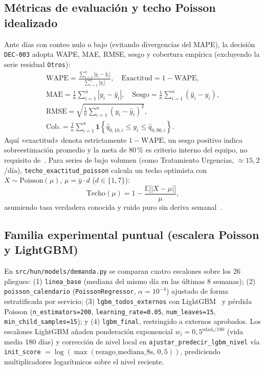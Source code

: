 \subsection{Métricas de evaluación y techo Poisson idealizado}

Ante días con conteo nulo o bajo (evitando divergencias del MAPE), la decisión \texttt{DEC-003} adopta WAPE, MAE, RMSE, sesgo y cobertura empírica (excluyendo la serie residual \texttt{Otros}):
\begin{equation}
\label{eq:metricas}
\begin{gathered}
\text{WAPE} = \frac{\sum_{i=1}^{n} |y_i - \hat{y}_i|}{\sum_{i=1}^{n} |y_i|}, \quad
\text{Exactitud} = 1 - \text{WAPE}, \\
\text{MAE} = \frac{1}{n}\sum_{i=1}^{n} |y_i - \hat{y}_i|, \quad
\text{Sesgo} = \frac{1}{n}\sum_{i=1}^{n} (\hat{y}_i - y_i), \\
\text{RMSE} = \sqrt{\frac{1}{n}\sum_{i=1}^{n} (y_i - \hat{y}_i)^2}, \\
\text{Cob.} = \frac{1}{n}\sum_{i=1}^{n} \mathbf{1}\!\left\{\hat{q}_{0{,}10,i} \le y_i \le \hat{q}_{0{,}90,i}\right\}.
\end{gathered}
\end{equation}
Aquí «exactitud» denota estrictamente $1-\text{WAPE}$, un sesgo positivo indica sobreestimación promedio y la meta de 80\,\% es criterio interno del equipo, no requisito de~\cite{hun2026terminos,mediflow2026demanda}. Para series de bajo volumen (como Tratamiento Urgencias, $\approx 15{,}2$/día), \texttt{techo\_exactitud\_poisson} calcula un techo optimista con $X \sim \text{Poisson}(\mu)$, $\mu = \bar{y}\cdot d$ ($d \in \{1,7\}$):
\begin{equation}
\label{eq:techo_poisson}
\text{Techo}(\mu) = 1 - \frac{\mathbb{E}\bigl[|X - \mu|\bigr]}{\mu},
\end{equation}
asumiendo tasa verdadera conocida y ruido puro sin deriva semanal~\cite{mediflow2026demanda}.

\subsection{Familia experimental puntual (escalera Poisson y LightGBM)}

En \texttt{src/hun/models/demanda.py} se comparan cuatro escalones sobre los 26 pliegues: (1) \texttt{linea\_base} (mediana del mismo día en las últimas 8 semanas); (2) \texttt{poisson\_calendario} (\texttt{PoissonRegressor}, $\alpha=10^{-4}$) ajustado de forma estratificada por servicio; (3) \texttt{lgbm\_todos\_externos} con LightGBM~\cite{ke2017lightgbm} y pérdida Poisson (\texttt{n\_estimators=200}, \texttt{learning\_rate=0.05}, \texttt{num\_leaves=15}, \texttt{min\_child\_samples=15}); y (4) \texttt{lgbm\_final}, restringido a externos aprobados. Los escalones LightGBM añaden ponderación exponencial $w_i = 0{,}5^{\text{edad}_i / 180}$ (vida media 180 días) y corrección de nivel local en \texttt{ajustar\_predecir\_lgbm\_nivel} vía \texttt{init\_score} $= \log(\max(\text{rezago\_mediana\_8s},\,0{,}5))$, prediciendo multiplicadores logarítmicos sobre el nivel reciente.

